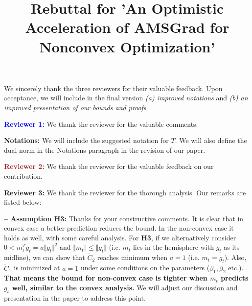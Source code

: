 \documentclass[wcp]{jmlr}
\title[]{Rebuttal for 'An Optimistic Acceleration of AMSGrad for Nonconvex Optimization'}
\begin{document}
\maketitle


We sincerely thank the three reviewers for their valuable feedback. 
Upon acceptance, we will include in the final version \emph{{\sf (a)} improved notations} and \emph{{\sf (b)} an improved presentation of our bounds and proofs}. 


\vspace{0.05in}

\textbf{\textcolor{blue}{Reviewer 1:}} We thank the reviewer for the valuable comments.\vspace{-5pt}

\medskip

\textbf{Notations:} 
We will include the suggested notation for $T$.
We will also define the dual norm in the Notations paragraph in the revision of our paper.

\vspace{0.05in}

\textbf{\textcolor{brown}{Reviewer 2:}} We thank the reviewer for the valuable feedback on our contribution.

\vspace{0.05in}

\textbf{\textcolor{green!50!black}{Reviewer 3:}} We thank the reviewer for the thorough analysis. Our remarks are listed below:\vspace{-5pt}

\medskip
\textbf{-- Assumption H3:}
Thanks for your constructive comments. It is clear that in convex case a better prediction reduces the bound. In the non-convex case it holds as well, with some careful analysis. For \textbf{H3}, if we alternatively consider $0<m_t^T g_t=a\Vert g_t\Vert^2$ and $\Vert m_t\Vert\leq \Vert g_t\Vert$ (i.e. $m_t$ lies in the hemisphere with $g_t$ as its midline), we can show that $\tilde C_2$ reaches minimum when $a=1$ (i.e. $m_t=g_t$). Also, $\tilde C_1$ is minimized at $a=1$ under some conditions on the parameters ($\beta_1,\beta_2$ etc.). \textbf{That means the bound for non-convex case is tighter when $m_t$ predicts $g_t$ well, similar to the convex analysis.} We will adjust our discussion and presentation in the paper to address this point. \vspace{-5pt}
\end{document}
